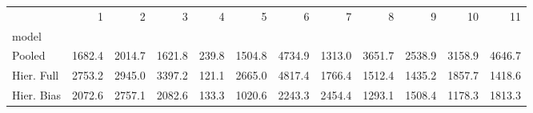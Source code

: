 \begin{tabular}{lrrrrrrrrrrr}
\toprule
{} &     1  &     2  &     3  &    4  &     5  &     6  &     7  &     8  &     9  &     10 &     11 \\
model      &        &        &        &       &        &        &        &        &        &        &        \\
\midrule
Pooled     & 1682.4 & 2014.7 & 1621.8 & 239.8 & 1504.8 & 4734.9 & 1313.0 & 3651.7 & 2538.9 & 3158.9 & 4646.7 \\
Hier. Full & 2753.2 & 2945.0 & 3397.2 & 121.1 & 2665.0 & 4817.4 & 1766.4 & 1512.4 & 1435.2 & 1857.7 & 1418.6 \\
Hier. Bias & 2072.6 & 2757.1 & 2082.6 & 133.3 & 1020.6 & 2243.3 & 2454.4 & 1293.1 & 1508.4 & 1178.3 & 1813.3 \\
\bottomrule
\end{tabular}
